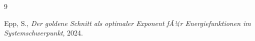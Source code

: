 ﻿\documentclass[a4paper,12pt]{article}
\theoremstyle{definition}
\begin{document}

\begin{thebibliography}{9}

Epp, S.,
\textit{Der goldene Schnitt als optimaler Exponent fÃ¼r Energiefunktionen im Systemschwerpunkt},
2024.

\end{thebibliography}
\end{document}

